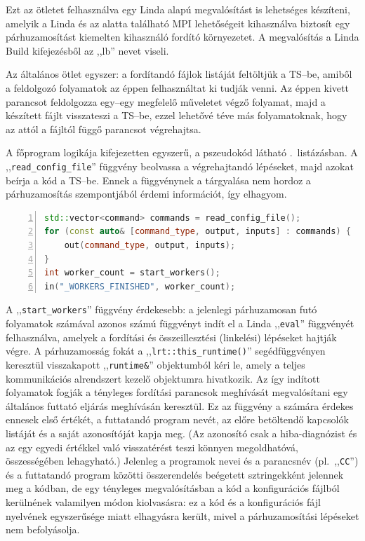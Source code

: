 Ezt az ötletet felhasználva egy Linda alapú megvalósítást is lehetséges készíteni, amelyik a Linda és az alatta található MPI lehetőségeit kihasználva biztosít egy párhuzamosítást kiemelten kihasználó fordító környezetet.
A megvalósítás a Linda Build kifejezésből az ,,lb'' nevet viseli.

Az általános ötlet egyszer: a fordítandó fájlok listáját feltöltjük a TS--be, amiből a feldolgozó folyamatok az éppen felhasználtat ki tudják venni.
Az éppen kivett parancsot feldolgozza egy--egy megfelelő műveletet végző folyamat, majd a készített fájlt visszateszi a TS--be, ezzel lehetővé téve más folyamatoknak, hogy az attól a fájltól függő parancsot végrehajtsa.

A főprogram logikája kifejezetten egyszerű, a pszeudokód látható .~listázásban.
A ,,\texttt{read\_config\_file}'' függvény beolvassa a végrehajtandó lépéseket, majd azokat beírja a kód a TS--be.
Ennek a függvénynek a tárgyalása nem hordoz a párhuzamosítás szempontjából érdemi információt, így elhagyom.

\begin{lstlisting}[numbers=left, language=C++, label=lst:lb-algo, caption={Az lb főprogram logikája}]
std::vector<command> commands = read_config_file();
for (const auto& [command_type, output, inputs] : commands) {
	out(command_type, output, inputs);
}
int worker_count = start_workers();
in("_WORKERS_FINISHED", worker_count);
\end{lstlisting}

A ,,\texttt{start\_workers}'' függvény érdekesebb: a jelenlegi párhuzamosan futó folyamatok számával azonos számú függvényt indít el a Linda ,,\texttt{eval}'' függvényét felhasználva, amelyek a fordítási és összeillesztési (linkelési) lépéseket hajtják végre.
A párhuzamosság fokát a ,,\texttt{lrt::this\_runtime()}'' segédfüggvényen keresztül visszakapott ,,\texttt{runtime\&}'' objektumból kéri le, amely a teljes kommunikációs alrendszert kezelő objektumra hivatkozik.
Az így indított folyamatok fogják a tényleges fordítási parancsok meghívását megvalósítani egy általános futtató eljárás meghívásán keresztül.
Ez az függvény a számára érdekes ennesek első értékét, a futtatandó program nevét, az előre betöltendő kapcsolók listáját és a saját azonosítóját kapja meg.
(Az azonosító csak a hiba-diagnózist és az egy egyedi értékkel való visszatérést teszi könnyen megoldhatóvá, összességében lehagyható.)
Jelenleg a programok nevei és a parancsnév (pl.\ ,,\texttt{CC}'') és a futtatandó program közötti összerendelés beégetett sztringekként jelennek meg a kódban, de egy tényleges megvalósításban a kód a konfigurációs fájlból kerülnének valamilyen módon kiolvasásra: ez a kód és a konfigurációs fájl nyelvének egyszerűsége miatt elhagyásra került, mivel a párhuzamosítási lépéseket nem befolyásolja.

